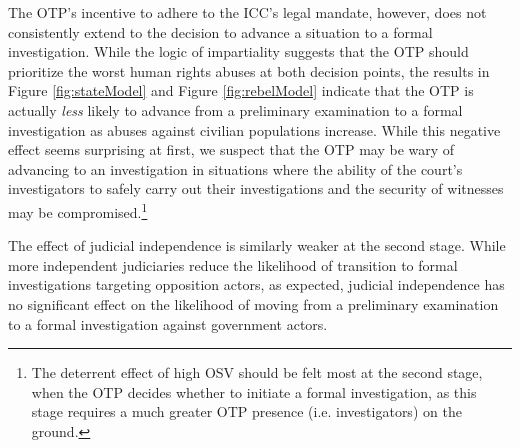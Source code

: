 The OTP's incentive to adhere to the ICC's legal mandate, however, does not consistently extend to the decision to advance a situation to a formal investigation. While the logic of impartiality suggests that the OTP should prioritize the worst human rights abuses at both decision points, the results in Figure \ref{fig:stateModel} and Figure \ref{fig:rebelModel} indicate that the OTP is actually \textit{less} likely to advance from a preliminary examination to a formal investigation as abuses against civilian populations increase. While this negative effect seems surprising at first, we suspect that the OTP may be wary of advancing to an investigation in situations where the ability of the court's investigators to safely carry out their investigations and the security of witnesses may be compromised.\footnote{The deterrent effect of high OSV should be felt most at the second stage, when the OTP decides whether to initiate a formal investigation, as this stage requires a much greater OTP presence (i.e. investigators) on the ground.}

The effect of judicial independence is similarly weaker at the second stage. While more independent judiciaries reduce the likelihood of transition to formal investigations targeting opposition actors, as expected, judicial independence has no significant effect on the likelihood of moving from a preliminary examination to a formal investigation against government actors. %

